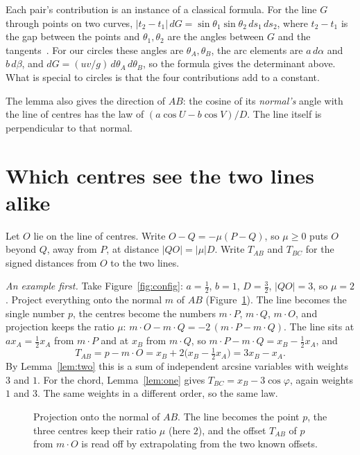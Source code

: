 \documentclass[11pt]{amsart}
\theoremstyle{remark}
\begin{document}
Each pair's contribution is an instance of a classical formula. For the line $G$ through points on two curves, $|t_2-t_1|\,dG=\sin\theta_1\sin\theta_2\,ds_1\,ds_2$, where $t_2-t_1$ is the gap between the points and $\theta_1,\theta_2$ are the angles between $G$ and the tangents~\cite[(3.30) and (4.2)]{Santalo}. For our circles these angles are $\theta_A,\theta_B$, the arc elements are $a\,d\alpha$ and $b\,d\beta$, and $dG=(uv/g)\,d\theta_A\,d\theta_B$, so the formula gives the determinant above. What is special to circles is that the four contributions add to a constant.

The lemma also gives the direction of $AB$: the cosine of its \emph{normal's} angle with the line of centres has the law of $(a\cos U-b\cos V)/D$. The line itself is perpendicular to that normal.

\section{Which centres see the two lines alike}\label{sec:char}

Let $O$ lie on the line of centres. Write $O-Q=-\mu(P-Q)$, so $\mu\ge0$ puts $O$ beyond $Q$, away from $P$, at distance $|QO|=|\mu| D$. Write $T_{AB}$ and $T_{BC}$ for the signed distances from $O$ to the two lines.

\emph{An example first.} Take Figure~\ref{fig:config}: $a=\tfrac12$, $b=1$, $D=\tfrac32$, $|QO|=3$, so $\mu=2$. Project everything onto the normal $m$ of $AB$ (Figure~\ref{fig:proj}). The line becomes the single number $p$, the centres become the numbers $m\cdot P$, $m\cdot Q$, $m\cdot O$, and projection keeps the ratio $\mu$: $m\cdot O-m\cdot Q=-2\,(m\cdot P-m\cdot Q)$. The line sits at $a x_A=\tfrac12x_A$ from $m\cdot P$ and at $x_B$ from $m\cdot Q$, so $m\cdot P-m\cdot Q=x_B-\tfrac12x_A$, and
\[
T_{AB}=p-m\cdot O=x_B+2\bigl(x_B-\tfrac12x_A\bigr)=3x_B-x_A.
\]
By Lemma~\ref{lem:two} this is a sum of independent arcsine variables with weights $3$ and $1$. For the chord, Lemma~\ref{lem:one} gives $T_{BC}=x_B-3\cos\varphi$, again weights $1$ and $3$. The same weights in a different order, so the same law.

\begin{figure}[ht]
\centering
{}
\caption{Projection onto the normal of $AB$. The line becomes the point $p$, the three centres keep their ratio $\mu$ (here $2$), and the offset $T_{AB}$ of $p$ from $m\cdot O$ is read off by extrapolating from the two known offsets.}
\label{fig:proj}
\end{figure}
\end{document}
